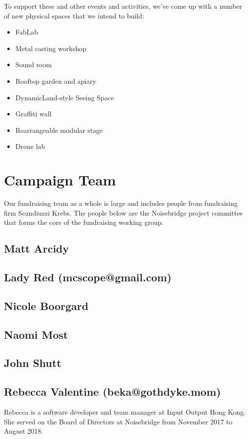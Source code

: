 \documentclass[12pt]{article}
\begin{document}
To support these and other events and activities, we've come up with a number of new physical spaces that we intend to build:

\begin{itemize}
    \item FabLab
    \item Metal casting workshop
    \item Sound room
    \item Rooftop garden and apiary
    \item DynamicLand-style Seeing Space
    \item Graffiti wall
    \item Rearrangeable modular stage
    \item Drone lab
\end{itemize}





\section{Campaign Team}

Our fundraising team as a whole is large and includes people from fundraising firm Scandiuzzi Krebs. The people below are the Noisebridge project committee that forms the core of the fundraising working group.

\subsection{Matt Arcidy}

\subsection{Lady Red (mcscope@gmail.com)}

\subsection{Nicole Boorgard}

\subsection{Naomi Most}

\subsection{John Shutt}

\subsection{Rebecca Valentine (beka@gothdyke.mom)} Rebecca is a software developer and team manager at Input Output Hong Kong. She served on the Board of Directors at Noisebridge from November 2017 to August 2018.
\end{document}

